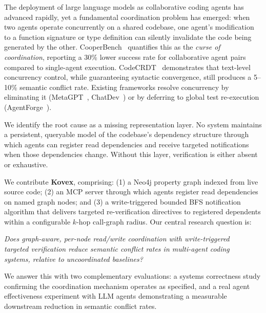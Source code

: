 \documentclass[12pt]{article}
\begin{document}
The deployment of large language models as collaborative coding agents has
advanced rapidly, yet a fundamental coordination problem has emerged: when two
agents operate concurrently on a shared codebase, one agent's modification to a
function signature or type definition can silently invalidate the code being
generated by the other. CooperBench~\cite{khatua2026cooperbench} quantifies this
as the \emph{curse of coordination}, reporting a 30\% lower success rate for
collaborative agent pairs compared to single-agent execution. CodeCRDT~\cite{pugachev2025codecrdt}
demonstrates that text-level concurrency control, while guaranteeing syntactic
convergence, still produces a 5--10\% semantic conflict rate. Existing frameworks
resolve concurrency by eliminating it (MetaGPT~\cite{hong2024metagpt},
ChatDev~\cite{qian2024chatdev}) or by deferring to global test re-execution
(AgentForge~\cite{kumar2026agentforge}).

We identify the root cause as a missing representation layer. No system maintains
a persistent, queryable model of the codebase's dependency structure through which
agents can register read dependencies and receive targeted notifications when those
dependencies change. Without this layer, verification is either absent or exhaustive.

We contribute \textbf{Kovex}, comprising: (1) a Neo4j property graph indexed from
live source code; (2) an MCP server through which agents register read dependencies
on named graph nodes; and (3) a write-triggered bounded BFS notification algorithm
that delivers targeted re-verification directives to registered dependents within
a configurable $k$-hop call-graph radius. Our central research question is:

\begin{center}
\emph{Does graph-aware, per-node read/write coordination with write-triggered}\\
\emph{targeted verification reduce semantic conflict rates in multi-agent coding}\\
\emph{systems, relative to uncoordinated baselines?}
\end{center}

We answer this with two complementary evaluations: a systems correctness study
confirming the coordination mechanism operates as specified, and a real agent
effectiveness experiment with LLM agents demonstrating a measurable downstream
reduction in semantic conflict rates.

\end{document}

